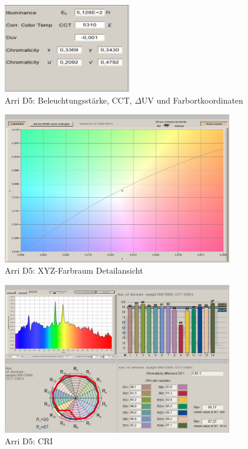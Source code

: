 \begin{figure}[htp]     %
\centering
\includegraphics[width=0.5\textwidth]{vormessung/arriD5vorcct} 
\caption {Arri D5: Beleuchtungsstärke, CCT, $\Delta$UV und Farbortkoordinaten} 
\end{figure}

\begin{figure}[htp]     %
\centering
\includegraphics[width=0.9\textwidth]{vormessung/arriD5vorxy} 
\caption {Arri D5: XYZ-Farbraum Detailansicht} 
\end{figure}

\begin{figure}[htp]     %
\centering
\includegraphics[width=0.9\textwidth]{vormessung/arriD5vorcri} 
\caption {Arri D5: CRI} 
\end{figure}


